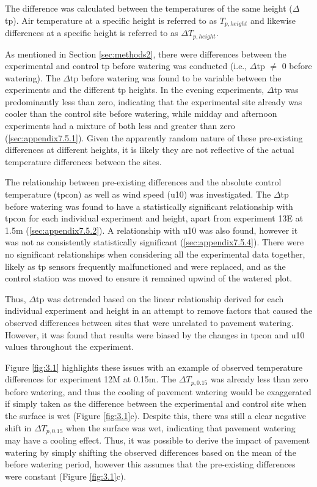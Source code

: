 \documentclass[final,3p,times,authoryear]{elsarticle}
\begin{document}
The difference was calculated between the temperatures of the same height ($\Delta$\gls{tp}). Air temperature at a specific height is referred to as $T_{p,height}$ and likewise differences at a specific height is referred to as $\Delta$$T_{p,height}$.

As mentioned in Section \ref{sec:methods2}, there were differences between the experimental
and control \gls{tp} before watering was conducted (i.e., $\Delta$\gls{tp} $\neq$ 0 before watering). The $\Delta$\gls{tp} before watering was found to be variable between the experiments and the different \gls{tp} heights. In the evening experiments, $\Delta$\gls{tp} was predominantly less than zero, indicating that the experimental site already was cooler than the control site before watering, while midday and afternoon experiments had a mixture of both less and greater than zero (\ref{sec:appendix7.5.1}). Given the apparently random nature of these pre-existing differences at different heights, it is likely they are not reflective of the actual temperature differences between the sites.

The relationship between pre-existing differences and the absolute control temperature
(\gls{tpcon}) as well as wind speed (\gls{u10}) was investigated. The $\Delta$\gls{tp} before watering was found to have a statistically significant relationship with \gls{tpcon} for each individual experiment and height, apart from experiment 13E at 1.5m (\ref{sec:appendix7.5.2}). A relationship with \gls{u10} was also found, however it was not as consistently statistically significant (\ref{sec:appendix7.5.4}). There were no significant relationships when considering all the experimental data together, likely as \gls{tp} sensors frequently malfunctioned and were replaced, and as the control station was moved to ensure it remained upwind of the watered plot.

Thus, $\Delta$\gls{tp} was detrended based on the linear relationship derived for each individual experiment and height in an attempt to remove factors that caused the observed
differences between sites that were unrelated to pavement watering. However, it was
found that results were biased by the changes in \gls{tpcon} and \gls{u10} values throughout the experiment.

Figure \ref{fig:3.1} highlights these issues with an example of observed temperature differences for experiment 12M at 0.15m. The $\Delta$$T_{p,0.15}$ was already less than zero before watering, and thus the cooling of pavement watering would be exaggerated if simply taken as the difference between the experimental and control site when the surface is wet (Figure \ref{fig:3.1}c). Despite this, there was still a clear negative shift in $\Delta$$T_{p,0.15}$ when the surface was wet, indicating that pavement watering may have a cooling effect. Thus, it was possible to derive the impact of pavement watering by simply shifting the observed differences based on the mean of the before watering period, however this assumes that the pre-existing differences were constant (Figure \ref{fig:3.1}c).
\end{document}
